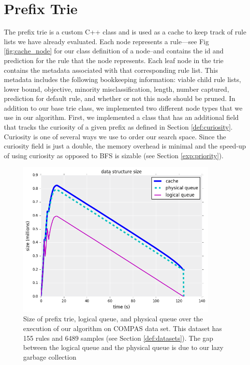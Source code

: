 \section{Prefix Trie}
The prefix trie is a custom C++ class and is used as a cache to keep track of rule lists we have already evaluated. 
Each node represents a rule---see Fig \ref{fig:cache_node} for our class definition of a node--and contains the id and prediction for the rule that the node represents.
Each leaf node in the trie contains the metadata associated with that corresponding rule list. 
This metadata includes the following bookkeeping information: viable child rule lists, lower bound, objective, minority misclassification, length, number captured, prediction for default rule, and whether or not this node should be pruned.
In addition to our base trie class, we implemented two different node types that we use in our algorithm.
First, we implemented a class that has an additional field that tracks the curiosity of a given prefix as defined in Section \ref{def:curiosity}.
Curiosity is one of several ways we use to order our search space.
Since the curiosity field is just a double, the memory overhead is minimal and the speed-up of using curiosity as opposed to BFS is sizable (see Section \ref{exp:priority}).

\begin{figure}[t!]
\begin{center}
\includegraphics[width=0.9\textwidth]{figs/compas-queue-cache-size-insertions.png}
\end{center}
\caption{Size of prefix trie, logical queue, and physical queue over the execution of our algorithm on COMPAS data set.
This dataset has 155 rules and 6489 samples (see Section \ref{def:datasets}).
The gap between the logical queue and the physical queue is due to our lazy garbage collection}
\label{fig:queue_gc}
\end{figure}

